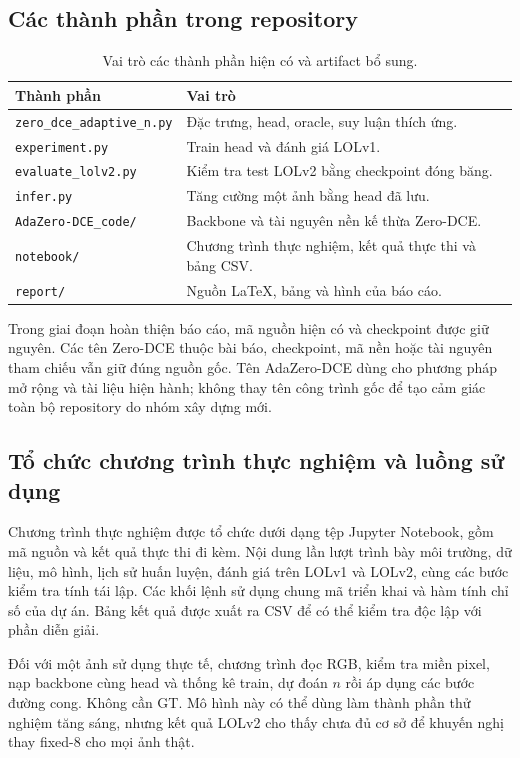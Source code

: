 \subsection{Các thành phần trong repository}
\begin{table}[H]\centering\small
\caption{Vai trò các thành phần hiện có và artifact bổ sung.}
\begin{tabularx}{\linewidth}{lX}\toprule
Thành phần & Vai trò\\\midrule
\texttt{zero\_dce\_adaptive\_n.py} & Đặc trưng, head, oracle, suy luận thích ứng.\\
\texttt{experiment.py} & Train head và đánh giá LOLv1.\\
\texttt{evaluate\_lolv2.py} & Kiểm tra test LOLv2 bằng checkpoint đóng băng.\\
\texttt{infer.py} & Tăng cường một ảnh bằng head đã lưu.\\
\texttt{AdaZero-DCE\_code/} & Backbone và tài nguyên nền kế thừa Zero-DCE.\\
\texttt{notebook/} & Chương trình thực nghiệm, kết quả thực thi và bảng CSV.\\
\texttt{report/} & Nguồn LaTeX, bảng và hình của báo cáo.\\\bottomrule
\end{tabularx}
\end{table}
Trong giai đoạn hoàn thiện báo cáo, mã nguồn hiện có và checkpoint được giữ nguyên. Các tên Zero-DCE thuộc bài báo, checkpoint, mã nền hoặc tài nguyên tham chiếu vẫn giữ đúng nguồn gốc. Tên AdaZero-DCE dùng cho phương pháp mở rộng và tài liệu hiện hành; không thay tên công trình gốc để tạo cảm giác toàn bộ repository do nhóm xây dựng mới.

\subsection{Tổ chức chương trình thực nghiệm và luồng sử dụng}
Chương trình thực nghiệm được tổ chức dưới dạng tệp Jupyter Notebook, gồm mã nguồn và kết quả thực thi đi kèm. Nội dung lần lượt trình bày môi trường, dữ liệu, mô hình, lịch sử huấn luyện, đánh giá trên LOLv1 và LOLv2, cùng các bước kiểm tra tính tái lập. Các khối lệnh sử dụng chung mã triển khai và hàm tính chỉ số của dự án. Bảng kết quả được xuất ra CSV để có thể kiểm tra độc lập với phần diễn giải.

Đối với một ảnh sử dụng thực tế, chương trình đọc RGB, kiểm tra miền pixel, nạp backbone cùng head và thống kê train, dự đoán $n$ rồi áp dụng các bước đường cong. Không cần GT. Mô hình này có thể dùng làm thành phần thử nghiệm tăng sáng, nhưng kết quả LOLv2 cho thấy chưa đủ cơ sở để khuyến nghị thay fixed-8 cho mọi ảnh thật.

